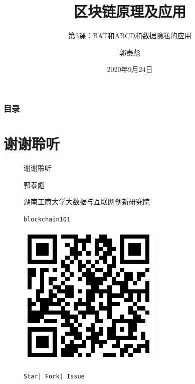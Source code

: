 \documentclass[11pt]{beamer}
\begin{document}
\author{郭泰彪}
\title{区块链原理及应用}
\subtitle{第3课：BAT和ABCD和数据隐私的应用}
\date{2020年9月24日}

\begin{frame}[plain]
	\maketitle
\end{frame}

\begin{frame}[shrink]
	\frametitle{目录}
	\tableofcontents[sectionstyle=show,subsectionstyle=show/shaded,subsubsectionstyle=show/shaded]
\end{frame}

\section*{谢谢聆听}

\begin{frame}
	\begin{minipage}[t]{0.5\linewidth}
		\begin{center}
			\begin{figure}
				\vspace{10pt}
				
				{\Huge 谢谢聆听}
				
				\vspace{30pt}
				郭泰彪
				
				\vspace{10pt}
				{\tiny 湖南工商大学大数据与互联网创新研究院}
			\end{figure}
			\begin{figure}
				
			\end{figure}
		\end{center}
	\end{minipage}%
	\begin{minipage}[t]{0.4\linewidth}
		\begin{figure}
			\centering
			\texttt{blockchain101}
			
			\includegraphics[width=0.6\linewidth]{figures/blockchain101qrcode}
			
			{\footnotesize \texttt{Star| Fork| Issue}}
		\end{figure}
	\end{minipage}%
\end{frame}
\end{document}
